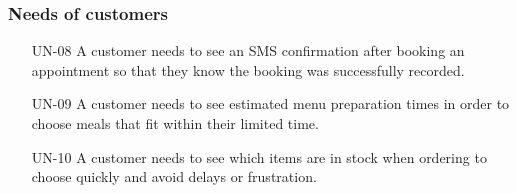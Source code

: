 \documentclass[]{VUMIFTemplateClass}
\newcommand{\todocomment}[1]{%
    \begin{tcolorbox}[colback=red!20, colframe=red!60, arc=0pt, outer arc=0pt, boxrule=1pt, left=3pt, right=3pt, top=3pt, bottom=3pt]
        \textbf{\textcolor{orange!70!black}{TODO:}} #1
    \end{tcolorbox}
}
\begin{document}
\subsubsection{Needs of customers}
\begin{itemize}
    \item[UN-08]\label{UN-08} A customer needs to see an SMS confirmation after booking an appointment so that they know the booking was successfully recorded.
    \item[UN-09]\label{UN-09}  A customer needs to see estimated menu preparation times in order to choose meals that fit within their limited time.
    \item[UN-10]\label{UN-10} A customer needs to see which items are in stock when ordering to choose quickly and avoid delays or frustration.


   
\end{itemize}

\end{document}
